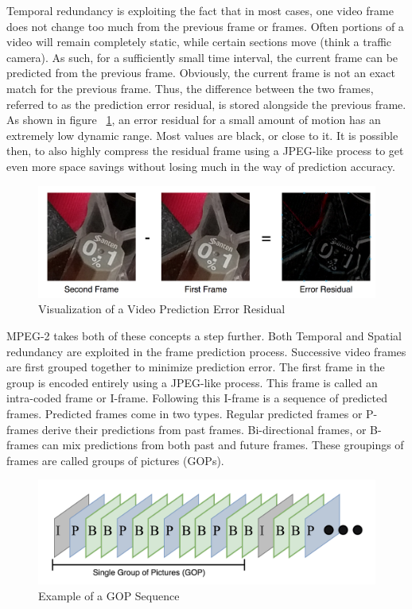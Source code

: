 Temporal redundancy is exploiting the fact that in most cases, one video frame does not change too much from the previous frame or frames. Often portions of a video will remain completely static, while certain sections move (think a traffic camera). As such, for a sufficiently small time interval, the current frame can be predicted from the previous frame. Obviously, the current frame is not an exact match for the previous frame. Thus, the difference between the two frames, referred to as the prediction error residual, is stored alongside the previous frame. As shown in figure ~\ref{residualvis}, an error residual for a small amount of motion has an extremely low dynamic range. Most values are black, or close to it. It is possible then, to also highly compress the residual frame using a JPEG-like process to get even more space savings without losing much in the way of prediction accuracy.

\begin{figure}[htbp]
\centerline{\includegraphics[width=0.9\linewidth]{Background/error_residual_vis.png}}
\caption{Visualization of a Video Prediction Error Residual}
\label{residualvis}
\end{figure}

MPEG-2 takes both of these concepts a step further. Both Temporal and Spatial redundancy are exploited in the frame prediction process. Successive video frames are first grouped together to minimize prediction error. The first frame in the group is encoded entirely using a JPEG-like process. This frame is called an intra-coded frame or I-frame. Following this I-frame is a sequence of predicted frames. Predicted frames come in two types. Regular predicted frames or P-frames derive their predictions from past frames. Bi-directional frames, or B-frames can mix predictions from both past and future frames. These groupings of frames are called groups of pictures (GOPs).

\begin{figure}[htbp]
\centerline{\includegraphics[width=0.9\linewidth]{Background/gop_example.png}}
\caption{Example of a GOP Sequence}
\label{exampleGOP}
\end{figure}

